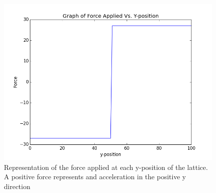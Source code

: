 \documentclass[12pt]{article}
\begin{document}
\begin{figure}[H]
	\centering
	\includegraphics[scale=0.5]{img/forceapplied}
	\caption{Representation of the force applied at each y-position of the lattice. A positive force represents and acceleration in the positive y direction}
	\label{forceapplied}
\end{figure}
\end{document}
